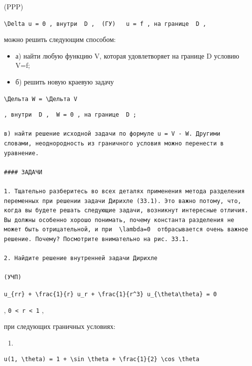 \documentclass[
  ukrainian,
]{article}
\providecommand{\tightlist}{%
  \setlength{\itemsep}{0pt}\setlength{\parskip}{0pt}}
\begin{document}
(PPP)

\texttt{\textquotesingle{}\textbackslash{}Delta\ u\ =\ 0\textquotesingle{}\ ,\ внутри\ \ \textquotesingle{}D\textquotesingle{}\ ,\ \ \textquotesingle{}(ГУ)\textquotesingle{}\ \ \ \textquotesingle{}u\ =\ f\textquotesingle{}\ ,\ на\ границе\ \ \textquotesingle{}D\textquotesingle{}\ ,}

можно решить следующим способом:

\begin{itemize}
\tightlist
\item
  а) найти любую функцию V, которая удовлетворяет на границе D условию
  V=f;
\item
  б) решить новую краевую задачу
\end{itemize}

\texttt{\textbackslash{}Дельта\ W\ =\ \textbackslash{}Дельта\ V}

\begin{verbatim}
, внутри  D ,  W = 0 , на границе  D ;

в) найти решение исходной задачи по формуле u = V - W. Другими словами, неоднородность из граничного условия можно перенести в уравнение.

#### ЗАДАЧИ

1. Тщательно разберитесь во всех деталях применения метода разделения переменных при решении задачи Дирихле (33.1). Это важно потому, что, когда вы будете решать следующие задачи, возникнут интересные отличия. Вы должны особенно хорошо понимать, почему константа разделения не может быть отрицательной, и при  \lambda=0  отбрасывается очень важное решение. Почему? Посмотрите внимательно на рис. 33.1.

2. Найдите решение внутренней задачи Дирихле

(УЧП)
\end{verbatim}

\texttt{u\_\{rr\}\ +\ \textbackslash{}frac\{1\}\{r\}\ u\_r\ +\ \textbackslash{}frac\{1\}\{r\^{}3\}\ u\_\{\textbackslash{}theta\textbackslash{}theta\}\ =\ 0}

, \texttt{0\ \textless{}\ r\ \textless{}\ 1} ,

при следующих граничных условиях:

\begin{enumerate}
\def\labelenumi{\alph{enumi})}
\tightlist
\item
\end{enumerate}

\begin{verbatim}
u(1, \theta) = 1 + \sin \theta + \frac{1}{2} \cos \theta
\end{verbatim}
\end{document}
